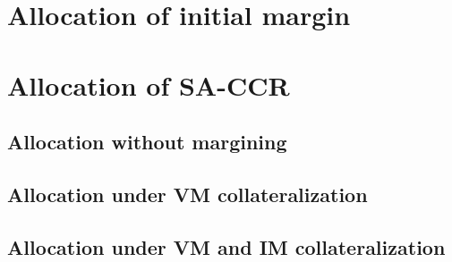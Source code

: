 \documentclass[../Thesis_AHoecherl.tex]{subfiles}
\begin{document}
    \section{Allocation of initial margin}\label{Allocation of initial margin}
    \section{Allocation of SA-CCR}\label{Allocation of SA-CCR}
    \subsection{Allocation without margining}
    \subsection{Allocation under VM collateralization}
    \subsection{Allocation under VM and IM collateralization}
\end{document}
